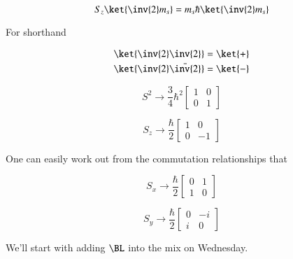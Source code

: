 \begin{equation}\label{eqn:qmTwoL13:490}
S_z 
\ket{\inv{2} m_s}  
= 
m_s \hbar 
\ket{\inv{2} m_s}  
\end{equation}

For shorthand

\begin{align}\label{eqn:qmTwoL13:510}
\ket{ \inv{2} \inv{2} } &= \ket{ + } \\
\ket{ \inv{2} \bar{\inv{2}} } &= \ket{ - }
\end{align}

\begin{equation}\label{eqn:qmTwoL13:530}
S^2 \rightarrow \frac{3}{4} \hbar^2 
\begin{bmatrix}
1 & 0 \\
0 & 1
\end{bmatrix}
\end{equation}

\begin{equation}\label{eqn:qmTwoL13:550}
S_z \rightarrow 
\frac{\hbar}{2}
\begin{bmatrix}
1 & 0 \\
0 & -1
\end{bmatrix}
\end{equation}

One can easily work out from the commutation relationships that

\begin{equation}\label{eqn:qmTwoL13:570}
S_x \rightarrow 
\frac{\hbar}{2}
\begin{bmatrix}
0 & 1 \\
1 & 0
\end{bmatrix}
\end{equation}

\begin{equation}\label{eqn:qmTwoL13:590}
S_y \rightarrow 
\frac{\hbar}{2}
\begin{bmatrix}
0 & -i \\
i & 0
\end{bmatrix}
\end{equation}

We'll start with adding $\BL$ into the mix on Wednesday.

\EndArticle
